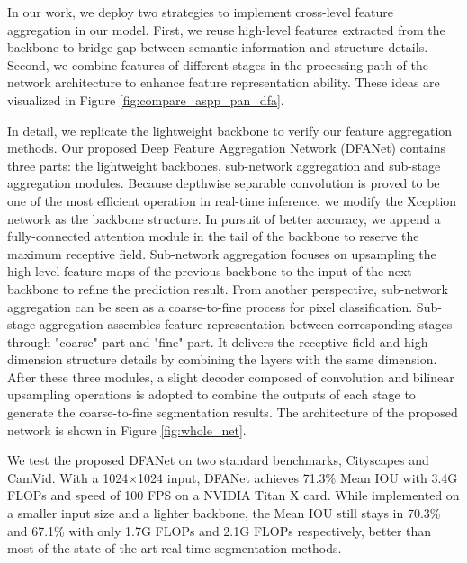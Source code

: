 \documentclass[10pt,twocolumn,letterpaper]{article}
\begin{document}
In our work, we deploy two strategies to implement cross-level feature aggregation in our model.
First, we reuse high-level features extracted from the backbone to bridge gap between semantic information and structure details.
Second, we combine features of different stages in the processing path of the network architecture to enhance feature representation ability. These ideas are visualized in Figure \ref{fig:compare_aspp_pan_dfa}.


In detail, we replicate the lightweight backbone to verify our feature aggregation methods. Our proposed Deep Feature Aggregation Network (DFANet) contains three parts: the lightweight backbones, sub-network aggregation and sub-stage aggregation modules. Because depthwise separable convolution is proved to be one of the most efficient operation in real-time inference, we modify the Xception network as the backbone structure. In pursuit of better accuracy, we append a fully-connected attention module in the tail of the backbone to reserve the maximum receptive field. 
Sub-network aggregation focuses on upsampling the high-level feature maps of the previous backbone to the input of the next backbone to refine the prediction result. From another perspective, sub-network aggregation can be seen as a coarse-to-fine process for pixel classification. 
Sub-stage aggregation assembles feature representation between corresponding stages through "coarse" part and "fine" part. It delivers the receptive field and high dimension structure details by combining the layers with the same dimension. After these three modules, a slight decoder composed of convolution and bilinear upsampling operations is adopted to combine the outputs of each stage to generate the coarse-to-fine segmentation results. The architecture of the proposed network is shown in Figure \ref{fig:whole_net}. 



We test the proposed DFANet on two standard benchmarks, Cityscapes and CamVid. 
With a 1024$\times$1024 input, DFANet achieves 71.3\% Mean IOU with 3.4G FLOPs and speed of 100 FPS on a NVIDIA Titan X card. While implemented on a smaller input size and a lighter backbone, the Mean IOU still stays in 70.3\% and 67.1\% with only 1.7G FLOPs and 2.1G FLOPs respectively, better than most of the state-of-the-art real-time segmentation methods.
\end{document}
